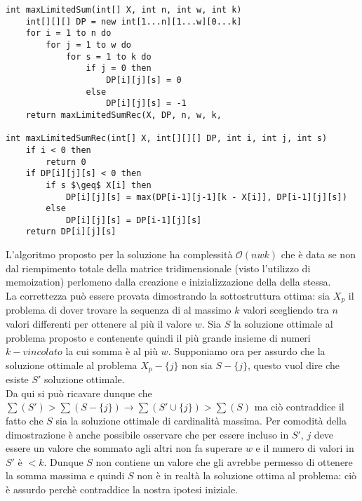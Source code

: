 \documentclass[../cheatSheetAlgoritmi.tex]{subfiles}
\begin{document}
\begin{lstlisting}[caption=Somma Massimale (k w)-vincolata]
int maxLimitedSum(int[] X, int n, int w, int k)
	int[][][] DP = new int[1...n][1...w][0...k]
	for i = 1 to n do
		for j = 1 to w do
			for s = 1 to k do
				if j = 0 then 
					DP[i][j][s] = 0
				else 
					DP[i][j][s] = -1
	return maxLimitedSumRec(X, DP, n, w, k, 

int maxLimitedSumRec(int[] X, int[][][] DP, int i, int j, int s)
	if i < 0 then
		return 0
	if DP[i][j][s] < 0 then
		if s $\geq$ X[i] then
			DP[i][j][s] = max(DP[i-1][j-1][k - X[i]], DP[i-1][j][s])
		else
			DP[i][j][s] = DP[i-1][j][s]
	return DP[i][j][s]
\end{lstlisting}
L'algoritmo proposto per la soluzione ha complessità $\mathcal{O}(nwk)$ che è data se non dal riempimento totale della matrice tridimensionale (visto l'utilizzo di memoization) perlomeno dalla creazione e inizializzazione della della stessa.\\
La correttezza può essere provata dimostrando la sottostruttura ottima: sia $X_{p}$ il problema di dover trovare la sequenza di al massimo $k$ valori scegliendo tra $n$ valori differenti per ottenere al più il valore $w$. Sia $S$ la soluzione ottimale al problema proposto e contenente quindi il più grande insieme di numeri $k-vincolato$ la cui somma è al più $w$. Supponiamo ora per assurdo che la soluzione ottimale al problema $X_{p} - \{j\}$ non sia $S - \{j\}$, questo vuol dire che esiste $S'$ soluzione ottimale.\\
Da qui si può ricavare dunque che $\sum(S') > \sum(S - \{j\}) \rightarrow \sum(S' \cup \{j\}) > \sum(S)$ ma ciò contraddice il fatto che $S$ sia la soluzione ottimale di cardinalità massima. Per comodità della dimostrazione è anche possibile osservare che per essere incluso in $S'$, $j$ deve essere un valore che sommato agli altri non fa superare $w$ e il numero di valori in $S'$ è $< k$. Dunque $S$ non contiene un valore che gli avrebbe permesso di ottenere la somma massima e quindi $S$ non è in realtà la soluzione ottima al problema: ciò è assurdo perchè contraddice la nostra ipotesi iniziale.
\newpage
\end{document}
